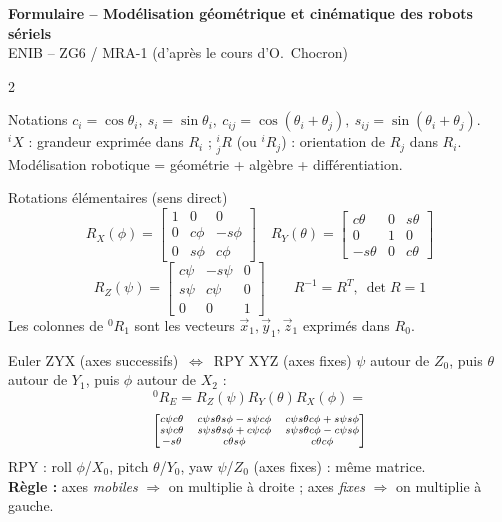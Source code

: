 \documentclass[10pt,a4paper]{article}
\begin{document}
\begin{center}{\Large\bfseries Formulaire -- Modélisation géométrique et cinématique des robots sériels}\\[2pt]
{\small ENIB -- ZG6 / MRA-1 \quad (d'après le cours d'O.~Chocron)}\end{center}
\begin{multicols}{2}\small

\begin{fbx}{Notations}
$c_i=\cos\theta_i,\ s_i=\sin\theta_i,\ c_{ij}=\cos(\theta_i+\theta_j),\ s_{ij}=\sin(\theta_i+\theta_j)$.\\
${}^{i}X$ : grandeur exprimée dans $R_i$ ; ${}^{i}_{j}R$ (ou ${}^{i}R_j$) : orientation de $R_j$ dans $R_i$.\\
Modélisation robotique = géométrie + algèbre + différentiation.
\end{fbx}

\begin{fbx}{Rotations élémentaires (sens direct)}
\[R_X(\phi)=\begin{bmatrix}1&0&0\\0&c\phi&-s\phi\\0&s\phi&c\phi\end{bmatrix}\quad
R_Y(\theta)=\begin{bmatrix}c\theta&0&s\theta\\0&1&0\\-s\theta&0&c\theta\end{bmatrix}\]
\[R_Z(\psi)=\begin{bmatrix}c\psi&-s\psi&0\\s\psi&c\psi&0\\0&0&1\end{bmatrix}\qquad R^{-1}=R^T,\ \det R=1\]
Les colonnes de ${}^0R_1$ sont les vecteurs $\vec x_1,\vec y_1,\vec z_1$ exprimés dans $R_0$.
\end{fbx}

\begin{fbx}{Euler ZYX (axes successifs) \,$\Leftrightarrow$\, RPY XYZ (axes fixes)}
$\psi$ autour de $Z_0$, puis $\theta$ autour de $Y_1$, puis $\phi$ autour de $X_2$ :
\[{}^0R_E=R_Z(\psi)R_Y(\theta)R_X(\phi)=\]
\[\scriptsize\begin{bmatrix}c\psi c\theta & c\psi s\theta s\phi-s\psi c\phi & c\psi s\theta c\phi+s\psi s\phi\\
s\psi c\theta & s\psi s\theta s\phi+c\psi c\phi & s\psi s\theta c\phi-c\psi s\phi\\
-s\theta & c\theta s\phi & c\theta c\phi\end{bmatrix}\]
RPY : roll $\phi$/$X_0$, pitch $\theta$/$Y_0$, yaw $\psi$/$Z_0$ (axes fixes) : même matrice.\\
\textbf{Règle :} axes \emph{mobiles} $\Rightarrow$ on multiplie à droite ; axes \emph{fixes} $\Rightarrow$ on multiplie à gauche.
\end{fbx}


\end{multicols}
\end{document}
